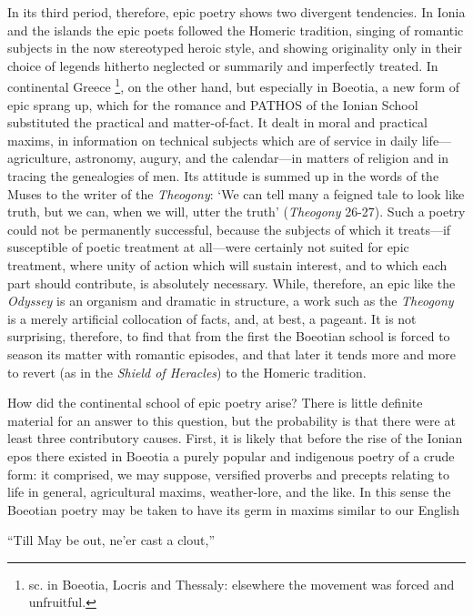 In its third period, therefore, epic poetry shows two divergent tendencies. In
Ionia and the islands the epic poets followed the Homeric tradition, singing of
romantic subjects in the now stereotyped heroic style, and showing originality
only in their choice of legends hitherto neglected or summarily and imperfectly
treated. In continental Greece \footnote{sc. in Boeotia, Locris and
Thessaly: elsewhere the movement was forced and unfruitful.}, on the other hand, but
especially in Boeotia, a new form of epic sprang up, which for the romance and
PATHOS of the Ionian School substituted the practical and matter-of-fact. It
dealt in moral and practical maxims, in information on technical subjects which
are of service in daily life—agriculture, astronomy, augury, and the
calendar—in matters of religion and in tracing the genealogies of men.
Its attitude is summed up in the words of the Muses to the writer of the
\emph{Theogony}: ‘We can tell many a feigned tale to look like truth, but
we can, when we will, utter the truth’ (\emph{Theogony} 26-27). Such a
poetry could not be permanently successful, because the subjects of which it
treats—if susceptible of poetic treatment at all—were certainly not
suited for epic treatment, where unity of action which will sustain interest,
and to which each part should contribute, is absolutely necessary. While,
therefore, an epic like the \emph{Odyssey} is an organism and dramatic in
structure, a work such as the \emph{Theogony} is a merely artificial
collocation of facts, and, at best, a pageant. It is not surprising, therefore,
to find that from the first the Boeotian school is forced to season its matter
with romantic episodes, and that later it tends more and more to revert (as in
the \emph{Shield of Heracles}) to the Homeric tradition.


How did the continental school of epic poetry arise? There is little definite
material for an answer to this question, but the probability is that there were
at least three contributory causes. First, it is likely that before the rise of
the Ionian epos there existed in Boeotia a purely popular and indigenous poetry
of a crude form: it comprised, we may suppose, versified proverbs and precepts
relating to life in general, agricultural maxims, weather-lore, and the like.
In this sense the Boeotian poetry may be taken to have its germ in maxims
similar to our English

“Till May be out, ne’er cast a clout,”

